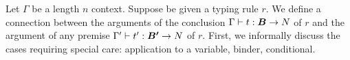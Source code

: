 %
%


Let $\Gamma$ be a length $n$ context.
Suppose be given a typing rule $r$.
We define a connection between the arguments of the conclusion $\Gamma \vdash t:\vec{B} 
\rightarrow \N$ of $r$ and the argument of any premise $\Gamma' \vdash t':\vec{B'} 
\rightarrow \N$ of $r$. First, we informally discuss the cases requiring special care:
application to a variable, binder, conditional.

